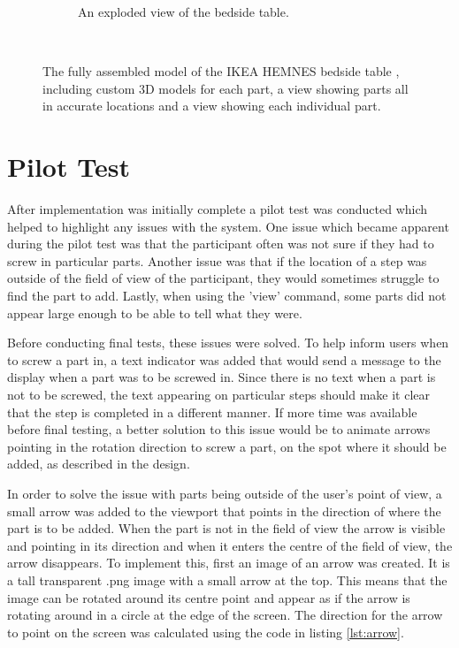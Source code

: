 \documentclass{l4proj}
\begin{document}
\begin{figure}[hbt!]
\begin{subfigure}[b]{0.45\textwidth}
        \caption{An exploded view of the bedside table.}
        \label{fig:syn2}
    \end{subfigure}
    ~ %
    \caption{The fully assembled model of the IKEA HEMNES bedside table \citep{noauthor_hemnes_nodate}, including custom 3D models for each part, a view showing parts all in accurate locations and a view showing each individual part.}
    \label{fig:explode}
\end{figure}


\section{Pilot Test}
\label{chap:pilotTest1}

After implementation was initially complete a pilot test was conducted which helped to highlight any issues with the system. One issue which became apparent during the pilot test was that the participant often was not sure if they had to screw in particular parts. Another issue was that if the location of a step was outside of the field of view of the participant, they would sometimes struggle to find the part to add. Lastly, when using the 'view' command, some parts did not appear large enough to be able to tell what they were.

Before conducting final tests, these issues were solved. To help inform users when to screw a part in, a text indicator was added that would send a message to the display when a part was to be screwed in. Since there is no text when a part is not to be screwed, the text appearing on particular steps should make it clear that the step is completed in a different manner. If more time was available before final testing, a better solution to this issue would be to animate arrows pointing in the rotation direction to screw a part, on the spot where it should be added, as described in the design.

In order to solve the issue with parts being outside of the user's point of view, a small arrow was added to the viewport that points in the direction of where the part is to be added. When the part is not in the field of view the arrow is visible and pointing in its direction and when it enters the centre of the field of view, the arrow disappears. To implement this, first an image of an arrow was created. It is a tall transparent .png image with a small arrow at the top. This means that the image can be rotated around its centre point and appear as if the arrow is rotating around in a circle at the edge of the screen. The direction for the arrow to point on the screen was calculated using the code in listing \ref{lst:arrow}.
\end{document}
